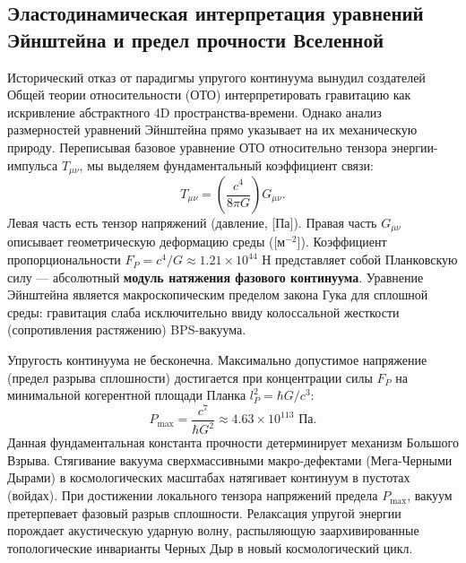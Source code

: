 \documentclass[11pt,a4paper]{article}
\begin{document}
\subsection{Эластодинамическая интерпретация уравнений Эйнштейна и предел прочности Вселенной}
Исторический отказ от парадигмы упругого континуума вынудил создателей Общей теории относительности (ОТО) интерпретировать гравитацию как искривление абстрактного 4D пространства-времени. Однако анализ размерностей уравнений Эйнштейна прямо указывает на их механическую природу.
Переписывая базовое уравнение ОТО относительно тензора энергии-импульса $T_{\mu\nu}$, мы выделяем фундаментальный коэффициент связи:
\begin{equation}
	T_{\mu\nu} = \left( \frac{c^4}{8\pi G} \right) G_{\mu\nu}.
\end{equation}
Левая часть есть тензор напряжений (давление, [Па]). Правая часть $G_{\mu\nu}$ описывает геометрическую деформацию среды ([м$^{-2}$]). Коэффициент пропорциональности $F_P = c^4/G \approx 1.21 \times 10^{44}$ Н представляет собой Планковскую силу — абсолютный \textbf{модуль натяжения фазового континуума}. Уравнение Эйнштейна является макроскопическим пределом закона Гука для сплошной среды: гравитация слаба исключительно ввиду колоссальной жесткости (сопротивления растяжению) BPS-вакуума.

Упругость континуума не бесконечна. Максимально допустимое напряжение (предел разрыва сплошности) достигается при концентрации силы $F_P$ на минимальной когерентной площади Планка $l_P^2 = \hbar G/c^3$:
\begin{equation}
	P_{\text{max}} = \frac{c^7}{\hbar G^2} \approx 4.63 \times 10^{113} \text{ Па}.
\end{equation}
Данная фундаментальная константа прочности детерминирует механизм Большого Взрыва. Стягивание вакуума сверхмассивными макро-дефектами (Мега-Черными Дырами) в космологических масштабах натягивает континуум в пустотах (войдах). При достижении локального тензора напряжений предела $P_{\text{max}}$, вакуум претерпевает фазовый разрыв сплошности. Релаксация упругой энергии порождает акустическую ударную волну, распыляющую заархивированные топологические инварианты Черных Дыр в новый космологический цикл.
\end{document}
